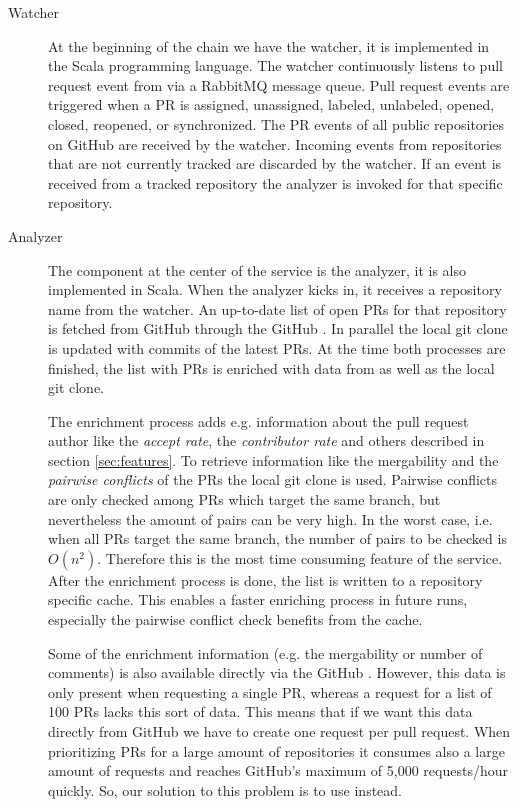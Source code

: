 \begin{description}
\item[Watcher]
At the beginning of the chain we have the watcher, it is implemented in the Scala programming language.
The watcher continuously listens to pull request event from \ghtorrent via a RabbitMQ message queue.
Pull request events are triggered when a PR is assigned, unassigned, labeled, unlabeled, opened, closed, reopened, or synchronized.
The PR events of all public repositories on GitHub are received by the watcher.
Incoming events from repositories that are not currently tracked are discarded by the watcher.
If an event is received from a tracked repository the analyzer is invoked for that specific repository.

\item[Analyzer]
The component at the center of the service is the analyzer, it is also implemented in Scala.
When the analyzer kicks in, it receives a repository name from the watcher.
An up-to-date list of open PRs for that repository is fetched from GitHub through the GitHub \api.
In parallel the local git clone is updated with commits of the latest PRs.
At the time both processes are finished, the list with PRs is enriched with data from \ghtorrent as well as the local git clone.

The enrichment process adds e.g. information about the pull request author like the \emph{accept rate}, the \emph{contributor rate} and others described in section \ref{sec:features}.
To retrieve information like the mergability and the \emph{pairwise conflicts} of the PRs the local git clone is used.
Pairwise conflicts are only checked among PRs which target the same branch, but nevertheless the amount of pairs can be very high.
In the worst case, i.e. when all PRs target the same branch, the number of pairs to be checked is $O(n^2)$.
Therefore this is the most time consuming feature of the service.
After the enrichment process is done, the list is written to a repository specific cache.
This enables a faster enriching process in future runs, especially the pairwise conflict check benefits from the cache.

Some of the enrichment information (e.g. the mergability or number of comments) is also available directly via the GitHub \api.
However, this data is only present when requesting a single PR, whereas a request for a list of 100 PRs lacks this sort of data.
This means that if we want this data directly from GitHub we have to create one \api request per pull request.
When prioritizing PRs for a large amount of repositories it consumes also a large amount of \api requests and reaches GitHub's maximum of 5,000 requests/hour quickly.
So, our solution to this problem is to use \ghtorrent instead.


\end{description}
